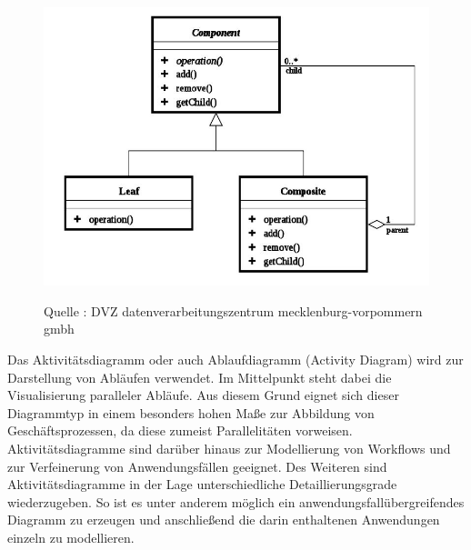 \begin{center}
\begin{figure}[h]
   
\includegraphics[scale=0.7]{Graphics/Klassendiagram.jpg} 



Quelle : DVZ datenverarbeitungszentrum mecklenburg-vorpommern gmbh

\label{fig3}


\end{figure}
\end{center}
\newpage
Das Aktivitätsdiagramm oder auch Ablaufdiagramm (Activity Diagram) wird zur Darstellung von Abläufen verwendet. Im Mittelpunkt steht dabei die Visualisierung paralleler Abläufe. Aus diesem Grund eignet sich dieser Diagrammtyp in einem besonders hohen Maße zur Abbildung von Geschäftsprozessen, da diese zumeist Parallelitäten vorweisen. Aktivitätsdiagramme sind darüber hinaus zur Modellierung von Workflows und zur Verfeinerung von Anwendungsfällen geeignet. Des Weiteren sind Aktivitätsdiagramme in der Lage unterschiedliche Detaillierungsgrade wiederzugeben. So ist es unter anderem möglich ein anwendungsfallübergreifendes Diagramm zu erzeugen und anschließend die darin enthaltenen Anwendungen einzeln zu modellieren.\\ \\

